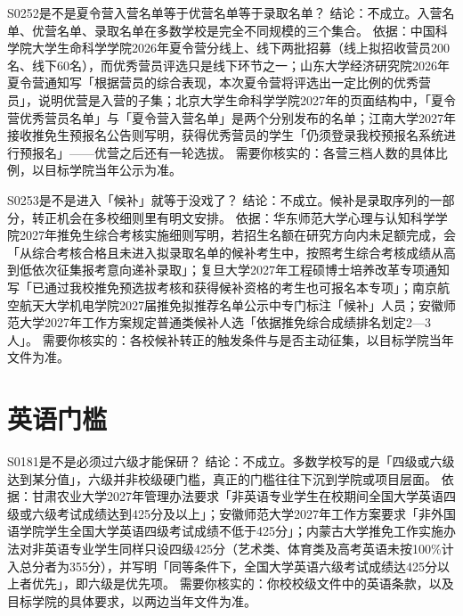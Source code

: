 \begin{qa}{S0252}{是不是夏令营入营名单等于优营名单等于录取名单？}
结论：不成立。入营名单、优营名单、录取名单在多数学校是完全不同规模的三个集合。
依据：中国科学院大学生命科学学院2026年夏令营分线上、线下两批招募（线上拟招收营员200名、线下60名），而优秀营员评选只是线下环节之一；山东大学经济研究院2026年夏令营通知写「根据营员的综合表现，本次夏令营将评选出一定比例的优秀营员」，说明优营是入营的子集；北京大学生命科学学院2027年的页面结构中，「夏令营优秀营员名单」与「夏令营入营名单」是两个分别发布的名单；江南大学2027年接收推免生预报名公告则写明，获得优秀营员的学生「仍须登录我校预报名系统进行预报名」——优营之后还有一轮选拔。
需要你核实的：各营三档人数的具体比例，以目标学院当年公示为准。
\end{qa}

\begin{qa}{S0253}{是不是进入「候补」就等于没戏了？}
结论：不成立。候补是录取序列的一部分，转正机会在多校细则里有明文安排。
依据：华东师范大学心理与认知科学学院2027年推免生综合考核实施细则写明，若招生名额在研究方向内未足额完成，会「从综合考核合格且未进入拟录取名单的候补考生中，按照考生综合考核成绩从高到低依次征集报考意向递补录取」；复旦大学2027年工程硕博士培养改革专项通知写「已通过我校推免预选拔考核和获得候补资格的考生也可报名本专项」；南京航空航天大学机电学院2027届推免拟推荐名单公示中专门标注「候补」人员；安徽师范大学2027年工作方案规定普通类候补人选「依据推免综合成绩排名划定2—3人」。
需要你核实的：各校候补转正的触发条件与是否主动征集，以目标学院当年文件为准。
\end{qa}

\section{英语门槛}
\begin{qa}{S0181}{是不是必须过六级才能保研？}
结论：不成立。多数学校写的是「四级或六级达到某分值」，六级并非校级硬门槛，真正的门槛往往下沉到学院或项目层面。
依据：甘肃农业大学2027年管理办法要求「非英语专业学生在校期间全国大学英语四级或六级考试成绩达到425分及以上」；安徽师范大学2027年工作方案要求「非外国语学院学生全国大学英语四级考试成绩不低于425分」；内蒙古大学推免工作实施办法对非英语专业学生同样只设四级425分（艺术类、体育类及高考英语未按100\%计入总分者为355分），并写明「同等条件下，全国大学英语六级考试成绩达425分以上者优先」，即六级是优先项。
需要你核实的：你校校级文件中的英语条款，以及目标学院的具体要求，以两边当年文件为准。
\end{qa}

